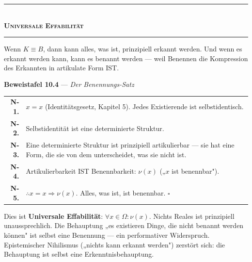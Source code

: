 \documentclass[10pt, openany, oneside]{book}
\renewcommand{\normalsize}{\fontsize{10}{13}\selectfont}
\renewcommand{\footnotesize}{\fontsize{8.5}{11}\selectfont}
\begin{document}
\vspace{1.5em}


\begin{center}
    \rule{0.3\textwidth}{0.4pt}\\[0.5em]
    {\normalsize\bfseries\scshape Universale Effabilität}\\[0.3em]
    \rule{0.3\textwidth}{0.4pt}
\end{center}

\vspace{1em}

\noindent Wenn $K \equiv B$, dann kann alles, was ist, prinzipiell erkannt werden. Und wenn es erkannt werden kann, kann es benannt werden --- weil Benennen die Kompression des Erkannten in artikulate Form IST.

\textbf{Beweistafel 10.4} --- \textit{Der Benennungs-Satz}

\vspace{0.5em}

{\footnotesize
\noindent\begin{tabular}{r p{}}
\textbf{N-1.} & $x = x$ (Identitätsgesetz, Kapitel 5). Jedes Existierende ist selbstidentisch. \\[0.3em]
\textbf{N-2.} & Selbstidentität ist eine determinierte Struktur. \\[0.3em]
\textbf{N-3.} & Eine determinierte Struktur ist prinzipiell artikulierbar --- sie hat eine Form, die sie von dem unterscheidet, was sie nicht ist. \\[0.3em]
\textbf{N-4.} & Artikulierbarkeit IST Benennbarkeit: $\nu(x)$ („$x$ ist benennbar"). \\[0.3em]
\textbf{N-5.} & $\therefore x = x \Rightarrow \nu(x)$. Alles, was ist, ist benennbar. $\square$ \\[0.3em]
\end{tabular}
}

\vspace{0.8em}

\noindent Dies ist \textbf{Universale Effabilität}: $\forall x \in \Omega: \nu(x)$. Nichts Reales ist prinzipiell unaussprechlich. Die Behauptung „es existieren Dinge, die nicht benannt werden können" ist selbst eine Benennung --- ein performativer Widerspruch. Epistemischer Nihilismus („nichts kann erkannt werden") zerstört sich: die Behauptung ist selbst eine Erkenntnisbehauptung.
\end{document}
